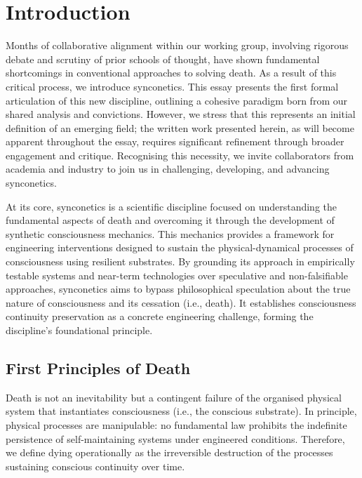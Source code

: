 \documentclass[10pt]{article}
\begin{document}
\begin{sloppypar}

  \section{Introduction}
  \label{sec:introduction}

  Months of collaborative alignment within our working group, involving rigorous debate and scrutiny of prior schools of thought, have shown fundamental shortcomings in conventional approaches to solving death. As a result of this critical process, we introduce synconetics. This essay presents the first formal articulation of this new discipline, outlining a cohesive paradigm born from our shared analysis and convictions. However, we stress that this represents an initial definition of an emerging field; the written work presented herein, as will become apparent throughout the essay, requires significant refinement through broader engagement and critique. Recognising this necessity, we invite collaborators from academia and industry to join us in challenging, developing, and advancing synconetics.

  At its core, synconetics is a scientific discipline focused on understanding the fundamental aspects of death and overcoming it through the development of synthetic consciousness mechanics. This mechanics provides a framework for engineering interventions designed to sustain the physical-dynamical processes of consciousness using resilient substrates. By grounding its approach in empirically testable systems and near-term technologies over speculative and non-falsifiable approaches, synconetics aims to bypass philosophical speculation about the true nature of consciousness and its cessation (i.e., death). It establishes consciousness continuity preservation as a concrete engineering challenge, forming the discipline’s foundational principle.

  \subsection{First Principles of Death}
  \label{sec:first-principles}

  Death is not an inevitability but a contingent failure of the organised physical system that instantiates consciousness (i.e., the conscious substrate). In principle, physical processes are manipulable: no fundamental law prohibits the indefinite persistence of self-maintaining systems under engineered conditions. Therefore, we define dying operationally as the irreversible destruction of the processes sustaining conscious continuity over time.


\end{sloppypar}
\end{document}
